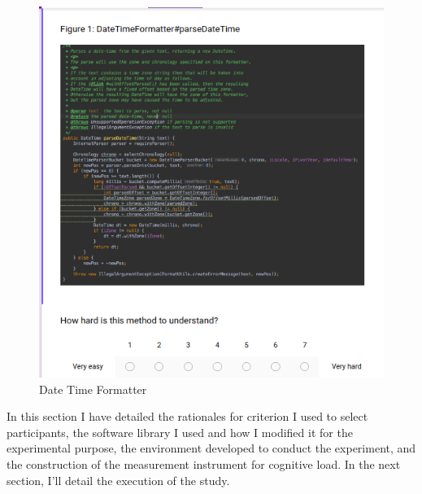 \begin{figure}[H]
	\centering
	\includegraphics[width=\linewidth]{DateTimeFormatter}
	\caption{Date Time Formatter}
\end{figure}

In this section I have detailed the rationales for criterion I used to select participants, the software library I used and how I modified it for the experimental purpose, the environment developed to conduct the experiment, and the construction of the measurement instrument for cognitive load. In the next section, I’ll detail the execution of the study.   
